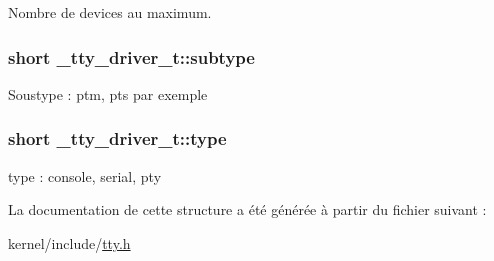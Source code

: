 Nombre de devices au maximum. \hypertarget{struct__tty__driver__t_a291fe7f9436ef9cbe34b490d516f46bd}{
\subsubsection[{subtype}]{\setlength{\rightskip}{0pt plus 5cm}short \+\_\+tty\+\_\+driver\+\_\+t\+::subtype}}\label{struct__tty__driver__t_a291fe7f9436ef9cbe34b490d516f46bd}
Soustype \+: ptm, pts par exemple \hypertarget{struct__tty__driver__t_a0c9f7f164f7454cf2bea36de5e23a5d1}{
\subsubsection[{type}]{\setlength{\rightskip}{0pt plus 5cm}short \+\_\+tty\+\_\+driver\+\_\+t\+::type}}\label{struct__tty__driver__t_a0c9f7f164f7454cf2bea36de5e23a5d1}
type \+: console, serial, pty 

La documentation de cette structure a été générée à partir du fichier suivant \+:\begin{DoxyCompactItemize}
\item 
kernel/include/\hyperlink{tty_8h}{tty.\+h}\end{DoxyCompactItemize}

